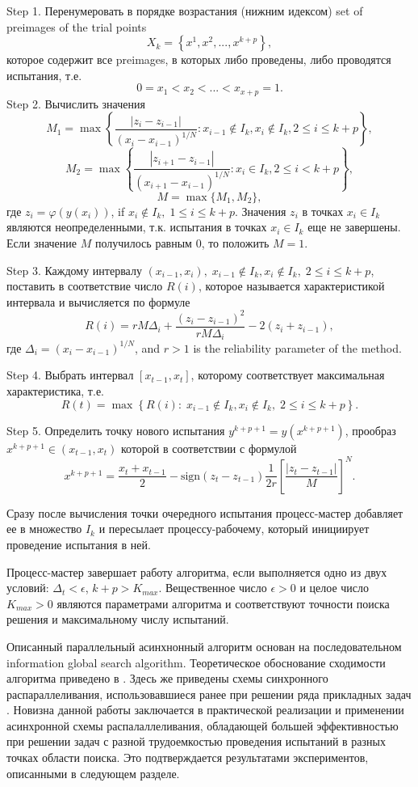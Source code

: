 \documentclass{svproc}
\begin{document}
Step 1. Перенумеровать в порядке возрастания (нижним идексом) set of preimages of the trial points 
\[
X_k = \left\{x^1, x^2,...,x^{k+p} \right\},
\]
которое содержит все preimages, в которых либо проведены, либо проводятся испытания, т.е.
\[
0=x_1<x_2<...<x_{x+p}=1.
\]
Step 2. Вычислить значения 
\[
M_1=\max \left\{ \frac{ \left|z_i - z_{i-1} \right|}{(x_i-x_{i-1})^{1/N}} : x_{i-1} \notin I_k, x_i \notin I_k, 2\leq i\leq k+p \right\},
\]
\[
M_2=\max \left\{ \frac{ \left|z_{i+1} - z_{i-1} \right|}{(x_{i+1}-x_{i-1})^{1/N}} : x_i \in I_k, 2\leq i < k+p \right\},
\]
\[
M=\max\{M_1,M_2\},
\]
где $z_i=\varphi(y(x_i))$, if $x_i \notin I_k, \; 1\leq i \leq k+p$. Значения $z_i$ в точках $x_i \in I_k$ являются неопределенными, т.к. испытания в точках $x_i \in I_k$ еще не завершены. Если значение $M$ получилось равным 0, то положить $M=1$.

Step 3. Каждому интервалу $(x_{i-1},x_i), \; x_{i-1} \notin I_k, x_i \notin I_k, \; 2\leq i\leq k+p$, поставить в соответствие число $R(i)$, которое называется характеристикой интервала и вычисляется по формуле
\[
R(i)=rM\Delta_i+\frac{(z_i-z_{i-1})^2}{rM\Delta_i}-2(z_i+z_{i-1}),
\]
где $\Delta_i=\left(x_i-x_{i-1}\right)^{1/N}$, and $r>1$ is the reliability parameter of the method.

Step 4. Выбрать интервал $[x_{t-1},x_t]$, которому соответствует максимальная характеристика, т.е.
\[
R(t) = \max \left\{ R(i): \; x_{i-1} \notin I_k, x_i \notin I_k, \; 2\leq i\leq k+p \right\}.
\]

Step 5. Определить точку нового испытания $y^{k+p+1}=y(x^{k+p+1})$, прообраз $x^{k+p+1} \in (x_{t-1},x_t)$ которой в соответствии с формулой
\[
x^{k+p+1} = \frac{x_{t}+x_{t-1}}{2} - \mathrm{sign}(z_{t}-z_{t-1})\frac{1}{2r}\left[\frac{\left|z_{t}-z_{t-1}\right|}{M}\right]^N.
\]


Сразу после вычисления точки очередного испытания процесс-мастер добавляет ее в множество $I_k$ и пересылает процессу-рабочему, который инициирует проведение испытания в ней. 

Процесс-мастер завершает работу алгоритма, если выполняется одно из двух условий: $\Delta_{t}<\epsilon$, $k+p>K_{max}$.
Вещественное число $\epsilon>0$ и целое число $K_{max}>0$ являются параметрами алгоритма и соответствуют точности поиска решения и максимальному числу испытаний.

Описанный параллельный асинхнонный алгоритм основан на последовательном information global search algorithm. Теоретическое обоснование сходимости алгоритма приведено в \cite{Strongin2000}. Здесь же приведены схемы синхронного распараллеливания, использовавшиеся ранее при решении ряда прикладных задач \cite{Kalyulin2017,Modorskii2016}.
Новизна данной работы заключается в практической реализации и применении асинхронной схемы распалаллеливания, обладающей большей эффективностью при решении задач с разной трудоемкостью проведения испытаний в разных точках области поиска. Это подтверждается результатами экспериментов, описанными в следующем разделе.
\end{document}
